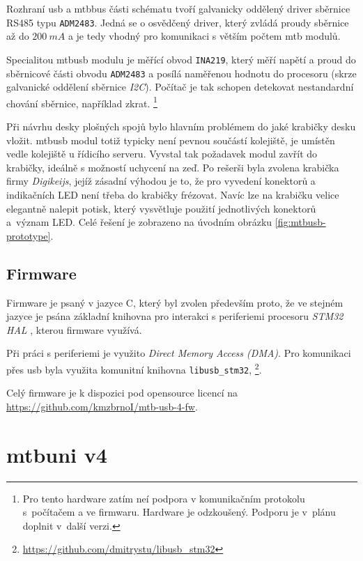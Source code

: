 Rozhraní \gls{usb} a \gls{mtbbus} části schématu tvoří galvanicky oddělený
driver sběrnice RS485 typu \texttt{ADM2483}. Jedná se o osvědčený driver,
který zvládá proudy sběrnice až do $200~mA$ \cite{adm2483-datasheet} a je tedy
vhodný pro komunikaci s větším počtem \gls{mtb} modulů.

Specialitou \gls{mtbusb} modulu je měřící obvod \texttt{INA219}, který měří
napětí a proud do sběrnicové části obvodu \texttt{ADM2483} a posílá naměřenou
hodnotu do procesoru (skrze galvanické oddělení sběrnice \textit{I2C}). Počítač
je tak schopen detekovat nestandardní chování sběrnice, například zkrat.
\footnote{Pro tento hardware zatím neí podpora v komunikačním protokolu
s~počítačem a ve firmwaru. Hardware je odzkoušený. Podporu je v~plánu doplnit
v~další verzi.}

Při návrhu desky plošných spojů bylo hlavním problémem do jaké krabičky desku
vložit. \gls{mtbusb} modul totiž typicky není pevnou součástí kolejiště, je
umístěn vedle kolejiště u řídicího serveru. Vyvstal tak požadavek modul zavřít
do krabičky, ideálně s možností uchycení na zeď. Po rešerši byla zvolena krabička
firmy \textit{Digikeijs}, jejíž zásadní výhodou je to, že pro vyvedení konektorů
a indikačních LED není třeba do krabičky frézovat. Navíc lze na krabičku velice
elegantně nalepit potisk, který vysvětluje použití jednotlivých konektorů
a~význam LED. Celé řešení je zobrazeno na úvodním obrázku
\ref{fig:mtbusb-prototype}.


\subsection{Firmware}

Firmware je psaný v jazyce C, který byl zvolen především proto, že ve stejném
jazyce je psána základní knihovna pro interakci s periferiemi procesoru
\textit{STM32 HAL} \cite{stm32-hal}, kterou firmware využívá.

Při práci s periferiemi je využito \textit{Direct Memory Access (DMA)}. Pro
komunikaci přes \gls{usb} byla využita komunitní knihovna \texttt{libusb\_stm32},
\footnote{\url{https://github.com/dmitrystu/libusb_stm32}}.

Celý firmware je k dispozici pod opensource licencí na
\url{https://github.com/kmzbrnoI/mtb-usb-4-fw}.


\section{\gls{mtbuni} v4}

